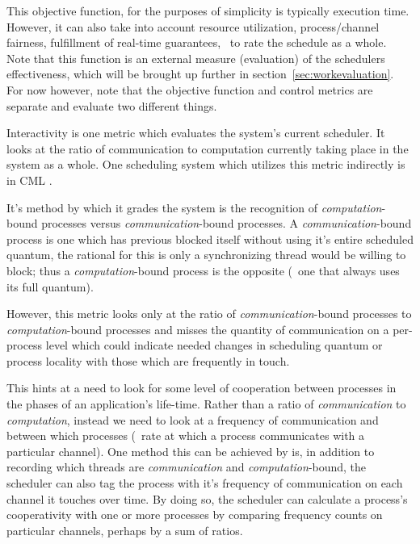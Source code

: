 This objective function, for the purposes of simplicity is typically execution time. However, it can also take into
account resource utilization, process/channel fairness, fulfillment of real-time guarantees, \etc~to rate the 
schedule as a whole. Note that this function is an external measure (evaluation) of the schedulers effectiveness,
which will be brought up further in section~\ref{sec:workevaluation}. For now however, note that the objective 
function and control metrics are separate and evaluate two different things.

Interactivity is one metric which evaluates the system's current scheduler. It looks at the ratio of communication
to computation currently taking place in the system as a whole. One scheduling system which utilizes this metric 
indirectly is in CML \cite{reppy1993concurrent}.

It's method by which it grades the system is the recognition of {\em computation}-bound processes versus
{\em communication}-bound processes. A {\em communication}-bound process is one which has previous blocked itself
without using it's entire scheduled quantum, the rational for this is only a synchronizing thread would be willing
to block; thus a {\em computation}-bound process is the opposite (\ie~one that always uses its full quantum). 

However, this metric looks only at the ratio of {\em communication}-bound processes to {\em computation}-bound
processes and misses the quantity of communication on a per-process level which could indicate needed changes in
scheduling quantum or process locality with those which are frequently in touch.

This hints at a need to look for some level of cooperation between processes in the phases of an application's
life-time. Rather than a ratio of {\em communication} to {\em computation}, instead we need to look at a 
frequency of communication and between which processes (\ie~rate at which a process communicates with a particular
channel). One method this can be achieved by is, in addition to recording which threads are {\em communication} and 
{\em computation}-bound, the scheduler can also tag the process with it's frequency of communication on each 
channel it touches over time. By doing so, the scheduler can calculate a process's cooperativity with one or more
processes by comparing frequency counts on particular channels, perhaps by a sum of ratios.


